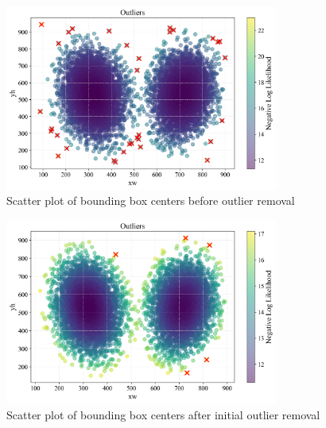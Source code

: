 \begin{figure}[H]
    \begin{center}
        \includegraphics[width = 0.8\textwidth]{figures/Figure20.png}
        \caption{Scatter plot of bounding box centers before outlier removal}
        \label{fig:cha-2 figure17}
    \end{center}
\end{figure}

\begin{figure}[H]
    \begin{center}
        \includegraphics[width = 0.8\textwidth]{figures/Figure21.png}
        \caption{Scatter plot of bounding box centers after initial outlier removal}
        \label{fig:cha-2 figure18}
    \end{center}
\end{figure}


